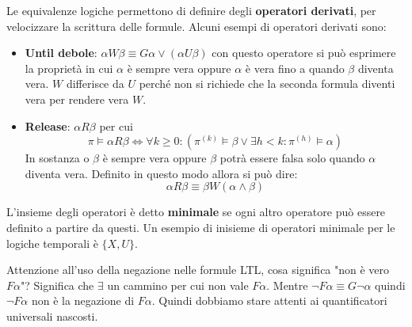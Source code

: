 Le equivalenze logiche permettono di definire degli \textbf{operatori derivati},
per velocizzare la scrittura delle formule. Alcuni esempi di operatori derivati
sono:
\begin{itemize}
    \item \textbf{Until debole}: $\alpha W \beta \equiv G\alpha \lor
              (\alpha U \beta)$ con questo operatore si può esprimere la proprietà
          in cui $\alpha$ è sempre vera oppure $\alpha$ è vera fino a quando
          $\beta$ diventa vera. $W$ differisce da $U$ perché non si richiede che
          la seconda formula diventi vera per rendere vera $W$.
    \item \textbf{Release}: $\alpha R \beta$ per cui
          \begin{equation}
              \pi \vDash \alpha R \beta \iff \forall k \geq 0: (\pi^{(k)} \vDash
              \beta \lor \exists h < k: \pi^{(h)} \vDash \alpha)
          \end{equation}
          In sostanza o $\beta$ è sempre vera oppure $\beta$ potrà essere falsa
          solo quando $\alpha$ diventa vera. Definito in questo modo allora si
          può dire:
          \begin{equation}
              \alpha R \beta \equiv \beta W (\alpha \land \beta)
          \end{equation}
\end{itemize}
\begin{definizione}
    L'insieme degli operatori è detto \textbf{minimale} se ogni altro
    operatore può essere definito a partire da questi. Un esempio di inisieme di
    operatori minimale per le logiche temporali è $\{X,U\}$.
\end{definizione}
Attenzione all'uso della negazione nelle formule LTL, cosa significa "non è vero
$F\alpha$"? Significa che $\exists$ un cammino per cui non vale $F\alpha$. Mentre
$\lnot F\alpha \equiv G\lnot \alpha$ quindi $\lnot F\alpha$ non è la negazione di
$F\alpha$. Quindi dobbiamo stare attenti ai quantificatori universali nascosti.

